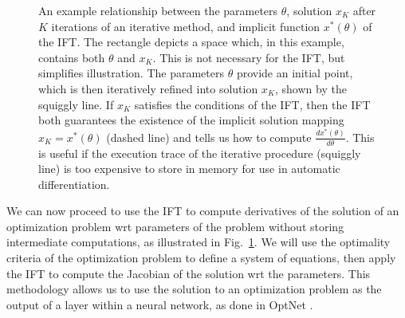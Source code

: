 \documentclass[11pt]{article}
\begin{document}

\begin{figure}
\centering
{}
\caption{
\label{fig:optift}
An example relationship between the parameters $\theta$,
solution $x_{K}$ after $K$ iterations of an iterative method,
and implicit function $x^*(\theta)$ of the IFT.
The rectangle depicts a space which, in this example,
contains both $\theta$ and $x_K$.
This is not necessary for the IFT, but simplifies illustration.
The parameters $\theta$ provide an initial point, which is then iteratively refined
into solution $x_{K}$, shown by the squiggly line.
If $x_{K}$ satisfies the conditions of the IFT, then the IFT both
guarantees the existence of the implicit solution mapping $x_K = x^*(\theta)$
(dashed line)
and tells us how to compute $\frac{dx^*(\theta)}{d\theta}$.
This is useful if the execution trace of the iterative procedure (squiggly line)
is too expensive to store in memory for use in automatic differentiation.
}
\end{figure}

We can now proceed to use the IFT
to compute derivatives of the solution of an optimization problem
wrt parameters of the problem without storing intermediate computations,
as illustrated in Fig.~\ref{fig:optift}.
We will use the optimality criteria of the optimization problem to define a system of equations,
then apply the IFT to compute the Jacobian of the solution wrt the parameters.
This methodology allows us to use the solution to an optimization problem
as the output of a layer within a neural network,
as done in OptNet \citep{optnet}.

\end{document}
